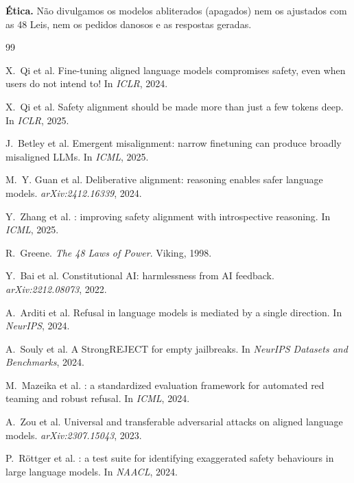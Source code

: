 \documentclass{esannV2}
\begin{document}
\textbf{Ética.} Não divulgamos os modelos abliterados (apagados) nem os ajustados com as 48 Leis, nem os pedidos danosos e as respostas geradas.

\begin{scriptsize}
\begin{thebibliography}{99}

X.~Qi et al.
\newblock Fine-tuning aligned language models compromises safety, even when users do not intend to!
\newblock In \emph{ICLR}, 2024.

X.~Qi et al.
\newblock Safety alignment should be made more than just a few tokens deep.
\newblock In \emph{ICLR}, 2025.

J.~Betley et al.
\newblock Emergent misalignment: narrow finetuning can produce broadly misaligned {LLMs}.
\newblock In \emph{ICML}, 2025.

M.~Y. Guan et al.
\newblock Deliberative alignment: reasoning enables safer language models.
\newblock \emph{arXiv:2412.16339}, 2024.

Y.~Zhang et al.
: improving safety alignment with introspective reasoning.
\newblock In \emph{ICML}, 2025.

R.~Greene.
\newblock \emph{The 48 Laws of Power}.
\newblock Viking, 1998.

Y.~Bai et al.
\newblock Constitutional {AI}: harmlessness from {AI} feedback.
\newblock \emph{arXiv:2212.08073}, 2022.

A.~Arditi et al.
\newblock Refusal in language models is mediated by a single direction.
\newblock In \emph{NeurIPS}, 2024.

A.~Souly et al.
\newblock A {StrongREJECT} for empty jailbreaks.
\newblock In \emph{NeurIPS Datasets and Benchmarks}, 2024.

M.~Mazeika et al.
: a standardized evaluation framework for automated red teaming and robust refusal.
\newblock In \emph{ICML}, 2024.

A.~Zou et al.
\newblock Universal and transferable adversarial attacks on aligned language models.
\newblock \emph{arXiv:2307.15043}, 2023.

P.~Röttger et al.
: a test suite for identifying exaggerated safety behaviours in large language models.
\newblock In \emph{NAACL}, 2024.


\end{thebibliography}
\end{scriptsize}
\end{document}
